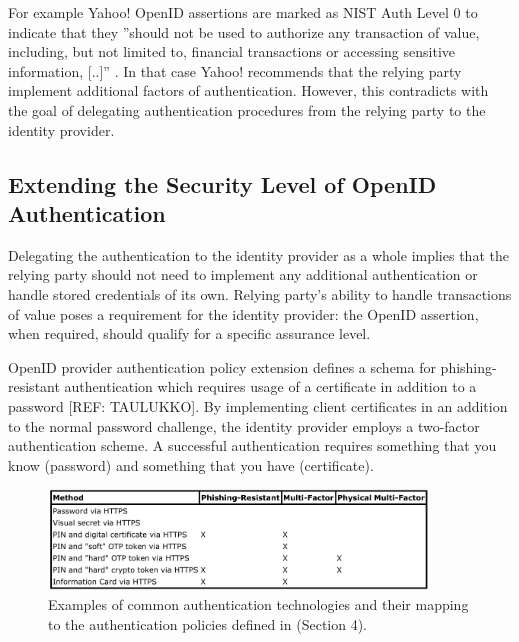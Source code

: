 \documentclass{tktltiki}
\begin{document}
   For example Yahoo! OpenID assertions are marked as NIST Auth Level 0 to indicate that they ''should not be used to authorize any transaction of value, including, but not limited to, financial transactions or accessing sensitive information, [..]'' \cite{yahoo_openid_bestpractices_2010}. In that case Yahoo! recommends that the relying party implement additional factors of authentication. However, this contradicts with the goal of delegating authentication procedures from the relying party to the identity provider.
    


\subsection{Extending the Security Level of OpenID Authentication}

    Delegating the authentication to the identity provider as a whole implies that the relying party should not need to implement any additional authentication or handle stored credentials of its own. Relying party's ability to handle transactions of value poses a requirement for the identity provider: the OpenID assertion, when required, should qualify for a specific assurance level.

    OpenID provider authentication policy extension defines a schema for phishing-resistant authentication \cite{openid_2.0_pape_07} which requires usage of a certificate in addition to a password [REF: TAULUKKO]. By implementing client certificates in an addition to the normal password challenge, the identity provider employs a two-factor authentication scheme. A successful authentication requires something that you know (password) and something that you have (certificate). 

    
    
\begin{figure}
  \centering
  \includegraphics[width=0.9\textwidth]{images/openid_authentication_policy_examples.jpg}
  \caption{Examples of common authentication technologies and their mapping to the authentication policies defined in \cite{openid_2.0_pape_07} (Section 4).}    
  \label{fig:openid_policy_examples}
\end{figure}
\end{document}
